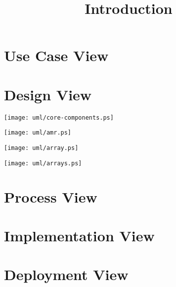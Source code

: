 \documentclass{book}
\begin{document}

\tableofcontents

\title{Introduction} \label{s:intro}


\chapter{Use Case View}

\chapter{Design View}

\centerline{\texttt{[image: uml/core-components.ps]}}

\centerline{\texttt{[image: uml/amr.ps]}}
\centerline{\texttt{[image: uml/array.ps]}}
\centerline{\texttt{[image: uml/arrays.ps]}}

\chapter{Process View}
\chapter{Implementation View}
\chapter{Deployment View}
\end{document}
